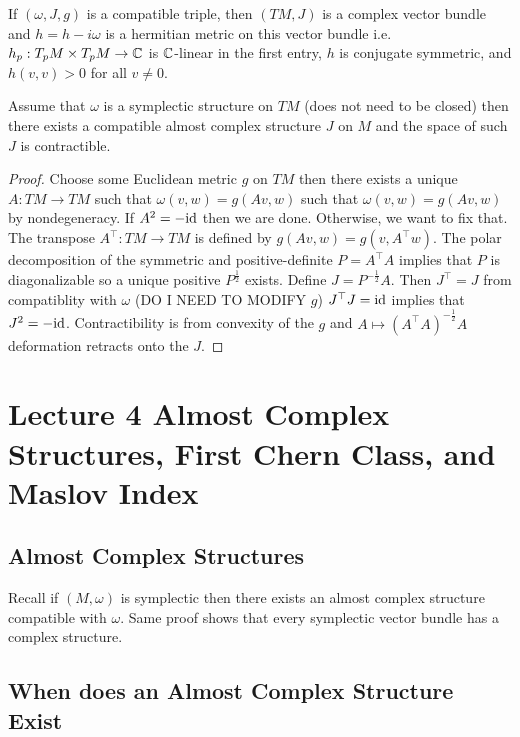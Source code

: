 \documentclass[12pt]{article}
\begin{document}
\begin{rmk}
If $(\omega, J, g)$ is a compatible triple, then $(TM, J)$ is a complex vector bundle and $h = h - i \omega$ is a hermitian metric on this vector bundle i.e. $h_p : T_p M \times T_p M \to \mathbb{C}$ is $\mathbb{C}$-linear in the first entry, $h$ is conjugate symmetric, and $h(v,v) > 0$ for all $v \neq 0$.
\end{rmk}

\begin{thm}
Assume that $\omega$ is a symplectic structure on $TM$ (does not need to be closed) then there exists a compatible almost complex structure $J$ on $M$ and the space of such $J$ is contractible.
\end{thm}

\begin{proof}
Choose some Euclidean metric $g$ on $TM$ then there exists a unique $A : TM \to TM$ such that $\omega(v, w) = g(Av, w)$ such that $\omega(v,w) = g(Av, w)$ by nondegeneracy. If $A^2 = -\mathrm{id}$ then we are done. Otherwise, we want to fix that. The transpose $A^\top : TM \to TM$ is defined by $g(Av,w) = g(v, A^\top w)$. The polar decomposition of the symmetric and positive-definite $P = A^\top A$ implies that $P$ is diagonalizable so a unique positive $P^{\frac{1}{2}}$ exists. Define $J = P^{-\frac{1}{2}} A$. Then $J^\top = J$ from compatiblity with $\omega$ (DO I NEED TO MODIFY $g$) $J^\top J = \mathrm{id}$ implies that $J^2 = - \mathrm{id}$. Contractibility is from convexity of the $g$ and $A \mapsto (A^\top A)^{-\frac{1}{2}} A$ deformation retracts onto the $J$. 
\end{proof}

\section{Lecture 4 Almost Complex Structures, First Chern Class, and Maslov Index}

\subsection{Almost Complex Structures}

Recall if $(M, \omega)$ is symplectic then there exists an almost complex structure compatible with $\omega$. Same proof shows that every symplectic vector bundle has a complex structure. 

\subsection{When does an Almost Complex Structure Exist}
\end{document}
